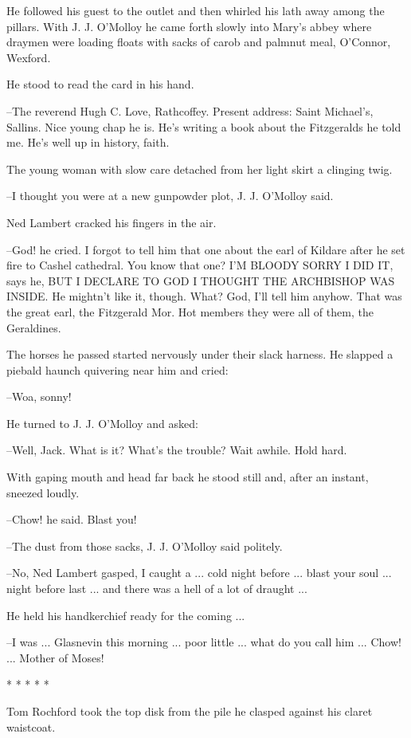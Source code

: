 He followed his guest to the outlet and then whirled his lath away
among the pillars. With J. J. O'Molloy he came forth slowly into Mary's
abbey where draymen were loading floats with sacks of carob and palmnut
meal, O'Connor, Wexford.

He stood to read the card in his hand.

--The reverend Hugh C. Love, Rathcoffey. Present address: Saint
Michael's, Sallins. Nice young chap he is. He's writing a book about the
Fitzgeralds he told me. He's well up in history, faith.

The young woman with slow care detached from her light skirt a
clinging twig.

--I thought you were at a new gunpowder plot, J. J. O'Molloy said.

Ned Lambert cracked his fingers in the air.

--God! he cried. I forgot to tell him that one about the earl of Kildare
after he set fire to Cashel cathedral. You know that one? I'M BLOODY SORRY
I DID IT, says he, BUT I DECLARE TO GOD I THOUGHT THE ARCHBISHOP WAS
INSIDE. He mightn't like it, though. What? God, I'll tell him anyhow.
That was the great earl, the Fitzgerald Mor. Hot members they were all of
them, the Geraldines.

The horses he passed started nervously under their slack harness. He
slapped a piebald haunch quivering near him and cried:

--Woa, sonny!

He turned to J. J. O'Molloy and asked:

--Well, Jack. What is it? What's the trouble? Wait awhile. Hold hard.

With gaping mouth and head far back he stood still and, after an
instant, sneezed loudly.

--Chow! he said. Blast you!

--The dust from those sacks, J. J. O'Molloy said politely.

--No, Ned Lambert gasped, I caught a ... cold night before ... blast
your soul ... night before last ... and there was a hell of a lot of
draught ...

He held his handkerchief ready for the coming ...

--I was ... Glasnevin this morning ... poor little ... what do you call
him ... Chow! ... Mother of Moses!


    * * * * *


Tom Rochford took the top disk from the pile he clasped against his
claret waistcoat.

